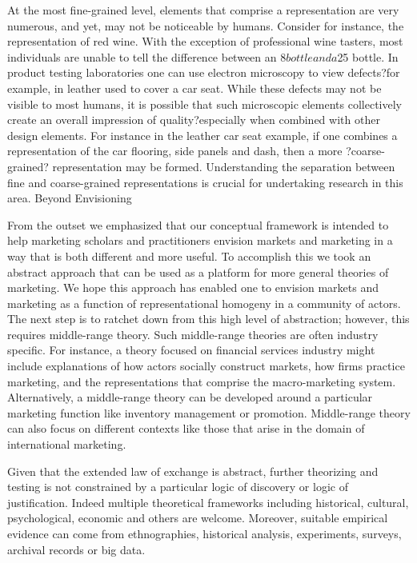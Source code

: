 At the most fine-grained level, elements that comprise a representation are very numerous, and yet, may not be noticeable by humans. Consider for instance, the representation of red wine. With the exception of professional wine tasters, most individuals are unable to tell the difference between an $8 bottle and a $25 bottle. In product testing laboratories one can use electron microscopy to view defects?for example, in leather used to cover a car seat. While these defects may not be visible to most humans, it is possible that such microscopic elements collectively create an overall impression of quality?especially when combined with other design elements. For instance in the leather car seat example, if one combines a representation of the car flooring, side panels and dash, then a more ?coarse-grained? representation may be formed. Understanding the separation between fine and coarse-grained representations is crucial for undertaking research in this area.
Beyond Envisioning 

	From the outset we emphasized that our conceptual framework is intended to help marketing scholars and practitioners envision markets and marketing in a way that is both different and more useful. To accomplish this we took an abstract approach that can be used as a platform for more general theories of marketing. We hope this approach has enabled one to envision markets and marketing as a function of representational homogeny in a community of actors. The next step is to ratchet down from this high level of abstraction; however, this requires middle-range theory. Such middle-range theories are often industry specific. For instance, a theory focused on financial services industry might include explanations of how actors socially construct markets, how firms practice marketing, and the representations that comprise the macro-marketing system. Alternatively, a middle-range theory can be developed around a particular marketing function like inventory management or promotion. Middle-range theory can also focus on different contexts like those that arise in the domain of international marketing. 

	Given that the extended law of exchange is abstract, further theorizing and testing is not constrained by a particular logic of discovery or logic of justification. Indeed multiple theoretical frameworks including historical, cultural, psychological, economic and others are welcome. Moreover, suitable empirical evidence can come from ethnographies, historical analysis, experiments, surveys, archival records or big data. 

